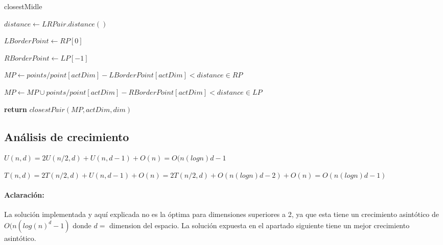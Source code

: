 \documentclass{article}
\begin{document}
		
		\begin{algorithm}

			\caption{closestMidle}

			\label{closestMidle}

			\begin{algorithmic}[1] %

			
				\State $distance \gets LRPair.distance()$

				\State $LBorderPoint \gets RP[0]$

				\State $RBorderPoint \gets LP[-1]$

				\State
				
				\State $MP \gets points/  point[actDim]-LBorderPoint[actDim] < distance \in RP$

				\State $MP \gets MP \cup points/  point[actDim]-RBorderPoint[actDim] < distance \in LP$

				\State	
								
				\State \textbf{return} $closestPair(MP, actDim, dim)$


			\EndProcedure

			\end{algorithmic}

		\end{algorithm}

	\subsection{Análisis de crecimiento}
	
	$U (n, d) = 2U (n/2, d) + U (n, d - 1) + O(n) = O(n(log n)d -1 $
	
	$T(n,d) = 2T(n/2,d) + U(n,d - 1) + O(n) = 2T (n/2, d) + O(n(log n)d-2) + O(n) = O(n(log n)d -1)$

	\paragraph{Aclaración:}
	La solución implementada y aquí explicada no es la óptima para dimensiones superiores a 2, ya que esta tiene un crecimiento asintótico de $O(n(log(n)^d-1)$ donde $d = $ dimension del espacio. La solución expuesta en el apartado siguiente tiene un mejor crecimiento asintótico.
		
\end{document}
